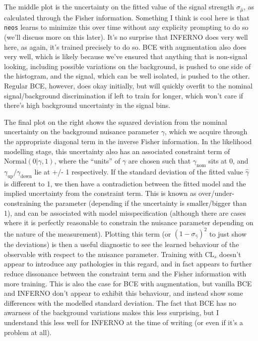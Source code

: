 \documentclass[
  11pt,
  numbers=noendperiod]{book}
\begin{document}
The middle plot is the uncertainty on the fitted value of the signal
strength \(\sigma_{\hat{\mu}}\), as calculated through the Fisher
information. Something I think is cool here is that \texttt{neos} learns
to minimize this over time without any explicity prompting to do so
(we'll discuss more on this later). It's no surprise that INFERNO does
very well here, as again, it's trained precisely to do so. BCE with
augmentation also does very well, which is likely because we've ensured
that anything that is non-signal looking, including possible variations
on the background, is pushed to one side of the histogram, and the
signal, which can be well isolated, is pushed to the other. Regular BCE,
however, does okay initially, but will quickly overfit to the nominal
signal/background discrimination if left to train for longer, which
won't care if there's high background uncertainty in the signal bins.

The final plot on the right shows the squared deviation from the nominal
uncertainty on the background nuisance parameter \(\gamma\), which we
acquire through the appropriate diagonal term in the inverse Fisher
information. In the likelihood modelling stage, this uncertainty also
has an associated constraint term of \(\mathrm{Normal}(0 | \gamma, 1)\),
where the ``units'' of \(\gamma\) are chosen such that
\(\gamma_{\mathrm{nom}}\) sits at 0, and
\(\gamma_{\mathrm{up}}/\gamma_{\mathrm{down}}\) lie at +/- 1
respectively. If the standard deviation of the fitted value
\(\hat{\gamma}\) is different to 1, we then have a contradiction between
the fitted model and the implied uncertainty from the constraint term.
This is known as over/under-constraining the parameter (depending if the
uncertainty is smaller/bigger than 1), and can be associated with model
misspecification (although there are cases where it is perfectly
reasonable to constrain the nuisance parameter depending on the nature
of the measurement). Plotting this term (or
\((1-\sigma_{\hat{\gamma}})^2\) to just show the deviations) is then a
useful diagnostic to see the learned behaviour of the observable with
respect to the nuisance parameter. Training with \(\mathrm{CL}_s\)
doesn't appear to introduce any pathologies in this regard, and in fact
appears to further reduce dissonance between the constraint term and the
Fisher information with more training. This is also the case for BCE
with augmentation, but vanilla BCE and INFERNO don't appear to exhibit
this behaviour, and instead show some differences with the modelled
standard deviation. The fact that BCE has no awarness of the background
variations makes this less surprising, but I understand this less well
for INFERNO at the time of writing (or even if it's a problem at all).
\end{document}
